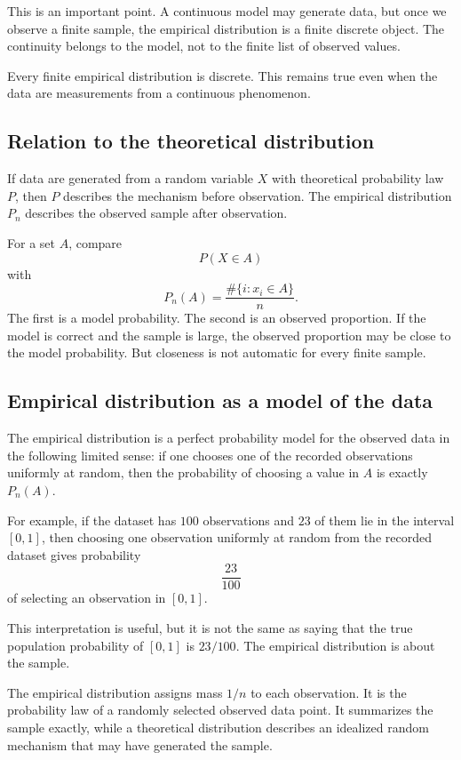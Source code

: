 This is an important point. A continuous model may generate data, but once we
observe a finite sample, the empirical distribution is a finite discrete object.
The continuity belongs to the model, not to the finite list of observed values.

\begin{remarkbox}
Every finite empirical distribution is discrete. This remains true even when the
data are measurements from a continuous phenomenon.
\end{remarkbox}

\subsection*{Relation to the theoretical distribution}

If data are generated from a random variable \(X\) with theoretical probability
law \(P\), then \(P\) describes the mechanism before observation. The empirical
distribution \(P_n\) describes the observed sample after observation.

For a set \(A\), compare
\[
P(X\in A)
\]
with
\[
P_n(A)=\frac{\#\{i:x_i\in A\}}{n}.
\]
The first is a model probability. The second is an observed proportion. If the
model is correct and the sample is large, the observed proportion may be close to
the model probability. But closeness is not automatic for every finite sample.

\subsection*{Empirical distribution as a model of the data}

The empirical distribution is a perfect probability model for the observed data
in the following limited sense: if one chooses one of the recorded observations
uniformly at random, then the probability of choosing a value in \(A\) is exactly
\(P_n(A)\).

For example, if the dataset has \(100\) observations and \(23\) of them lie in the
interval \([0,1]\), then choosing one observation uniformly at random from the
recorded dataset gives probability
\[
\frac{23}{100}
\]
of selecting an observation in \([0,1]\).

This interpretation is useful, but it is not the same as saying that the true
population probability of \([0,1]\) is \(23/100\). The empirical distribution is
about the sample.

\begin{summarybox}
The empirical distribution assigns mass \(1/n\) to each observation. It is the
probability law of a randomly selected observed data point. It summarizes the
sample exactly, while a theoretical distribution describes an idealized random
mechanism that may have generated the sample.
\end{summarybox}
